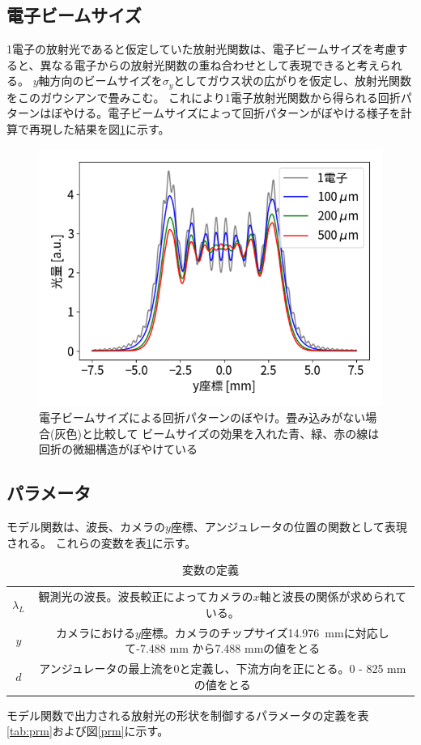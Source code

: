 \documentclass[a4paper,11pt,uplatex]{jsbook}
\begin{document}
\subsection{電子ビームサイズ}
1電子の放射光であると仮定していた放射光関数は、電子ビームサイズを考慮すると、異なる電子からの放射光関数の重ね合わせとして表現できると考えられる。
$y$軸方向のビームサイズを$\sigma_y$としてガウス状の広がりを仮定し、放射光関数をこのガウシアンで畳みこむ。
これにより1電子放射光関数から得られる回折パターンはぼやける。電子ビームサイズによって回折パターンがぼやける様子を計算で再現した結果を図\ref{beamsize}に示す。
\begin{figure}[h]
  \centering
  \includegraphics[width=0.8\linewidth]{image/4-esize.png}
  \caption[電子ビームサイズによる回折パターンのぼやけ]{電子ビームサイズによる回折パターンのぼやけ。畳み込みがない場合(灰色)と比較して
  ビームサイズの効果を入れた青、緑、赤の線は回折の微細構造がぼやけている}\label{beamsize}
\end{figure}

\subsection{パラメータ}
モデル関数は、波長、カメラの$y$座標、アンジュレータの位置の関数として表現される。
これらの変数を表\ref{tab:variables}に示す。
\begin{table}[h]
  \centering
  \begin{tabular}{c|c}
    $\lambda_L$ & 観測光の波長。波長較正によってカメラの$x$軸と波長の関係が求められている。\\
    $y$ & カメラにおける$y$座標。カメラのチップサイズ14.976~mmに対応して-7.488 mm から7.488 mmの値をとる\\
    $d$ & アンジュレータの最上流を0と定義し、下流方向を正にとる。0 - 825 mmの値をとる\\
  \end{tabular}
  \caption[変数の定義]{変数の定義}\label{tab:variables}
\end{table}
モデル関数で出力される放射光の形状を制御するパラメータの定義を表\ref{tab:prm}および図\ref{prm}に示す。
\end{document}

